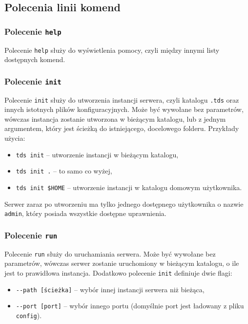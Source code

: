 \documentclass[10pt,a4paper]{article}
\begin{document}
\subsection{Polecenia linii komend}

\subsubsection{Polecenie \texttt{help}}
Polecenie \texttt{help} służy do wyświetlenia pomocy, czyli między innymi listy dostępnych komend.

\subsubsection{Polecenie \texttt{init}}
Polecenie \texttt{init} służy do utworzenia instancji serwera, czyli katalogu \texttt{.tds} oraz innych istotnych plików konfiguracyjnych. Może być wywołane bez parametrów, wówczas instancja zostanie utworzona w bieżącym katalogu, lub z jednym argumentem, który jest ścieżką do istniejącego, docelowego folderu. Przykłady użycia:
\begin{itemize}
    \item \texttt{tds init} -- utworzenie instancji w bieżącym katalogu,
    \item \texttt{tds init .} -- to samo co wyżej,
    \item \texttt{tds init \$HOME} -- utworzenie instancji w katalogu domowym użytkownika.
\end{itemize}
Serwer zaraz po utworzeniu ma tylko jednego dostępnego użytkownika o nazwie \texttt{admin}, który posiada wszystkie dostępne uprawnienia.

\subsubsection{Polecenie \texttt{run}}
Polecenie \texttt{run} służy do uruchamiania serwera. Może być wywołane bez parametrów, wówczas serwer zostanie uruchomiony w bieżącym katalogu, o ile jest to prawidłowa instancja. Dodatkowo polecenie \texttt{init} definiuje dwie flagi:

\begin{itemize}
    \item \texttt{-{}-path [ścieżka]} -- wybór innej instancji serwera niż bieżąca,
    \item \texttt{-{}-port [port]} -- wybór innego portu (domyślnie port jest ładowany z pliku \texttt{config}).
\end{itemize}
\end{document}
